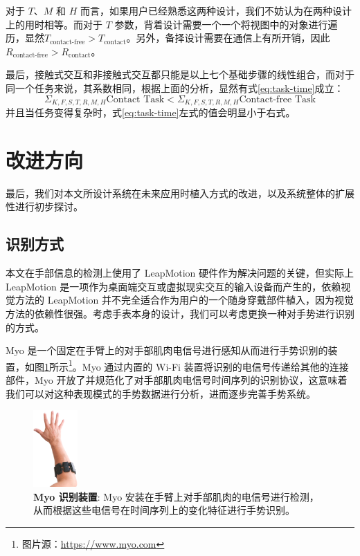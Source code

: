 对于 $T$、$M$ 和 $H$ 而言，如果用户已经熟悉这两种设计，我们不妨认为在两种设计上的用时相等。而对于 $T$ 参数，背着设计需要一个一个将视图中的对象进行遍历，显然$T_{\text{contact-free}}>T_{\text{contact}}$。另外，备择设计需要在通信上有所开销，因此$R_{\text{contact-free}}>R_{\text{contact}}$。

最后，接触式交互和非接触式交互都只能是以上七个基础步骤的线性组合，而对于同一个任务来说，其系数相同，根据上面的分析，显然有式\ref{eq:task-time}成立：
\begin{equation}
    \label{eq:task-time}
    \Sigma_{K,F,S,T,R,M,H}{\text{Contact Task}} < \Sigma_{K,F,S,T,R,M,H}{\text{Contact-free Task}}
\end{equation}
并且当任务变得复杂时，式\ref{eq:task-time}左式的值会明显小于右式。

\section{改进方向}

最后，我们对本文所设计系统在未来应用时植入方式的改进，以及系统整体的扩展性进行初步探讨。

\subsection{识别方式}

本文在手部信息的检测上使用了 LeapMotion 硬件作为解决问题的关键，但实际上 LeapMotion 是一项作为桌面端交互或虚拟现实交互的输入设备而产生的，依赖视觉方法的 LeapMotion 并不完全适合作为用户的一个随身穿戴部件植入，因为视觉方法的依赖性很强。考虑手表本身的设计，我们可以考虑更换一种对手势进行识别的方式。

Myo \cite{Myo:2016} 是一个固定在手臂上的对手部肌肉电信号进行感知从而进行手势识别的装置，如图\ref{fig:myo}所示\footnote{图片源：\url{https://www.myo.com}}。Myo 通过内置的 Wi-Fi 装置将识别的电信号传递给其他的连接部件，Myo 开放了并规范化了对手部肌肉电信号时间序列的识别协议，这意味着我们可以对这种表现模式的手势数据进行分析，进而逐步完善手势系统。

\begin{figure}[H]
    \kaishu
    \centering
    \includegraphics[width=0.15\textwidth]{figures/myo}
    \caption{\kaishu \textbf{Myo 识别装置}: Myo 安装在手臂上对手部肌肉的电信号进行检测，从而根据这些电信号在时间序列上的变化特征进行手势识别。}
    \label{fig:myo}
\end{figure}

